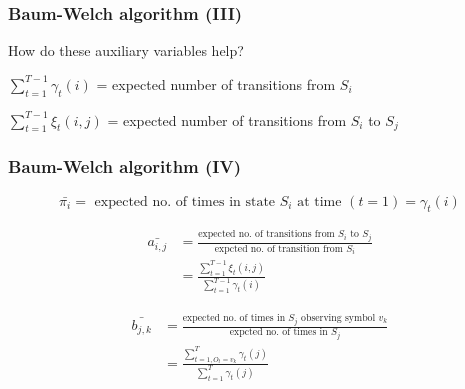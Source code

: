 \begin{frame}
	\frametitle{Baum-Welch algorithm (III)}
	How do these auxiliary variables help?
	\vspace*{1em}
	
	\begin{block}{}
	$\displaystyle\sum_{t=1}^{T-1}\gamma_t(i)$ = expected number of transitions from $S_i$
	\end{block}
	\vspace*{1em}
	\begin{block}{}
	$\displaystyle\sum_{t=1}^{T-1}\xi_t(i,j)$ = expected number of transitions from $S_i$ to $S_j$
	\end{block}
	
\end{frame}

\begin{frame}[t]
	\frametitle{Baum-Welch algorithm (IV)}
	\footnotesize
	\begin{equation*}
	\bar{\pi_i} = \mbox{ expected no. of times in state } S_i \mbox{ at time } (t=1) = \gamma_t(i)
	\end{equation*}
	\pause	
	
	\begin{equation*}
	\begin{split}
	\bar{a_{i,j}} & = \frac{\mbox{expected no. of transitions from } S_i \mbox{ to } S_j}
							{\mbox{expcted no. of transition from } S_i} \\
				  & = \frac{\displaystyle\sum_{t=1}^{T-1}\xi_t(i,j)}
				   			{\displaystyle\sum_{t=1}^{T-1}\gamma_t(i)}	
	\end{split}
	\end{equation*}
	\pause	
	
	\begin{equation*}
	\begin{split}
	\bar{b_{j,k}}  & = \frac{\mbox{expected no. of times in } S_j \mbox{ observing symbol } v_k}
							{\mbox{expcted no. of times in } S_j} \\
				   & = \frac{\displaystyle\sum_{t=1, O_t = v_k}^{T}\gamma_t(j)}
				   			{\displaystyle\sum_{t=1}^{T}\gamma_t(j)}	
	\end{split}
	\end{equation*}	
	\normalsize	
\end{frame}

